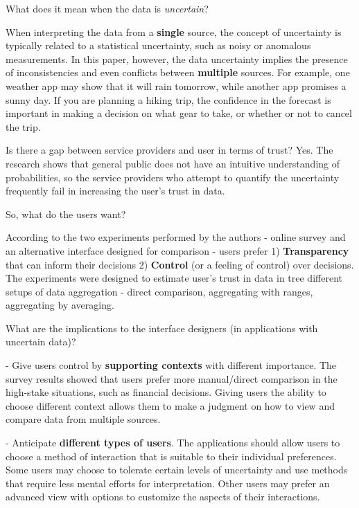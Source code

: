 \documentclass[12pt,letterpaper]{article}
\begin{document}
What does it mean when the data is \textit{uncertain}? 

When interpreting the data from a \textbf{single} source, the concept of uncertainty is typically related to a statistical uncertainty, such as noisy or anomalous measurements. In this paper, however, the data uncertainty implies the presence of inconsistencies and even conflicts between \textbf{multiple} sources. For example, one weather app may show that it will rain tomorrow, while another app promises a sunny day. If you are planning a hiking trip, the confidence in the forecast is important in making a decision on what gear to take, or whether or not to cancel the trip.  

Is there a gap between service providers and user in terms of trust? Yes. The research shows that general public does not have an intuitive understanding of probabilities, so the service providers who attempt to quantify the uncertainty frequently fail in increasing the user's trust in data.

So, what do the users want? 

According to the two experiments performed by the authors - online survey and an alternative interface designed for comparison - users prefer 1) \textbf{Transparency} that can inform their decisions 2) \textbf{Control} (or a feeling of control) over decisions. The experiments were designed to estimate user's trust in data in tree different setups of data aggregation - direct comparison, aggregating with ranges, aggregating by averaging. 

What are the implications to the interface designers (in applications with uncertain data)?

\hspace{10mm} - Give users control by \textbf{supporting contexts} with different importance. The survey results showed that users prefer more manual/direct comparison in the high-stake situations, such as financial decisions. Giving users the ability to choose different context allows them to make a judgment on how to view and compare data from multiple sources.  

\hspace{10mm} - Anticipate \textbf{different types of users}. The applications should allow users to choose a method of interaction that is suitable to their individual preferences. Some users may choose to tolerate certain levels of uncertainty and use methods that require less mental efforts for interpretation. Other users may prefer an advanced view with options to customize the aspects of their interactions. 
\end{document}
